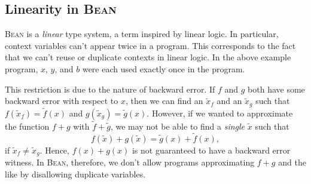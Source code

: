 \documentclass[a4paper]{article}
\newcommand{\Bean}{\textsc{Bean}}
\begin{document}
\subsection{Linearity in \Bean}
\Bean{} is a \emph{linear} type system, a term inspired by linear logic. In particular, context variables can't appear twice in a program. This corresponds to the fact that we can't reuse or duplicate contexts in linear logic. In the above example program, $x$, $y$, and $b$ were each used exactly once in the program. 

This restriction is due to the nature of backward error. If $f$ and $g$ both have some backward error with respect to $x$, then we can find an $\tilde{x}_f$ and an $\tilde{x}_g$ such that $f(\tilde{x}_f)=\tilde{f}(x)$ and $g(\tilde{x}_g)=\tilde{g}(x)$. However, if we wanted to approximate the function $f+g$ with $\tilde{f}+\tilde{g}$, we may not be able to find a \emph{single} $\tilde{x}$ such that 
\begin{equation*}
    f(\tilde{x})+g(\tilde{x})=\tilde{g}(x)+\tilde{f}(x),
\end{equation*}
if $\tilde{x}_f\neq \tilde{x}_g$. Hence, $f(x)+g(x)$ is not guaranteed to have a backward error witness. In \Bean{}, therefore, we don't allow programs approximating $f+g$ and the like by disallowing duplicate variables.
\end{document}
